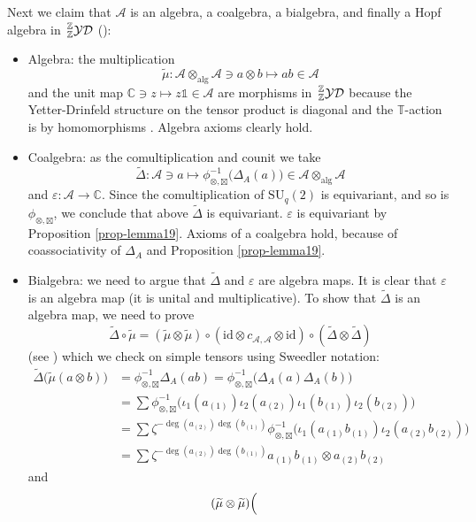 \documentclass[12pt,reqno,a4paper]{amsart}
\theoremstyle{definition}
\newcommand{\comp}{\circ}
\newcommand{\eps}{\varepsilon}
\newcommand{\I}{\mathds{1}}
\newcommand{\id}{\mathrm{id}}
\newcommand{\tens}{\otimes}
\newcommand{\algtens}{\otimes_{\textrm{alg}}}
\newcommand{\CC}{\mathbb{C}}
\newcommand{\TT}{\mathbb{T}}
\newcommand{\ZZ}{\mathbb{Z}}
\newcommand{\cA}{\mathscr{A}}
\newcommand{\SU}{\mathrm{SU}}
\numberwithin{equation}{section}
\begin{document}
Next we claim that $\cA$ is an algebra, a coalgebra, a bialgebra, and finally a Hopf algebra in $\sideset{_\ZZ^\ZZ}{}{\operatorname{\mathcal{YD}}}$ (\cite[Page 40]{HeckenbergerSchneider}):
\begin{itemize}
\item Algebra: the multiplication
\[
\widetilde{\mu}\colon\cA\algtens\cA\ni a\tens b\longmapsto ab\in\cA
\]
and the unit map $\CC\ni z\mapsto z\I \in\cA$ are morphisms in $\sideset{_\ZZ^\ZZ}{}{\operatorname{\mathcal{YD}}}$ because the Yetter-Drinfeld structure on the tensor product is diagonal and the $\TT$-action is by homomorphisms \cite[Page 29]{HeckenbergerSchneider}. Algebra axioms clearly hold.
\item Coalgebra: as the comultiplication and counit we take
\[
\widetilde{\Delta}\colon\cA\ni a\longmapsto\phi_{\tens,\boxtimes}^{-1}\bigl(\Delta_A(a)\bigr)\in\cA\algtens\cA
\]
and $\eps\colon\cA\to\CC$. Since the comultiplication of $\SU_q(2)$ is equivariant, and so is $\phi_{\tens,\boxtimes}$, we conclude that above $\widetilde{\Delta}$ is equivariant. $\eps$ is equivariant by Proposition \ref{prop-lemma19}. Axioms of a coalgebra hold, because of coassociativity of $\Delta_A$ and Proposition \ref{prop-lemma19}.
\item Bialgebra: we need to argue that $\widetilde{\Delta}$ and $\eps$ are algebra maps. It is clear that $\eps$ is an algebra map (it is unital and multiplicative). To show that $\widetilde{\Delta}$ is an algebra map, we need to prove
\[
\widetilde{\Delta}\comp\widetilde{\mu}
=(\widetilde{\mu}\tens\widetilde{\mu})\comp(\id\tens c_{\cA,\cA}\tens\id)\comp(\widetilde{\Delta}\tens\widetilde{\Delta})
\]
(see \cite[Definition 1.6.3]{HeckenbergerSchneider}) which we check on simple tensors using Sweedler notation:
\begin{align*}
\widetilde{\Delta}\bigl(\widetilde{\mu}(a\tens b)\bigr)
&=\phi_{\tens,\boxtimes}^{-1}\Delta_A(ab)
=\phi_{\tens,\boxtimes}^{-1}\bigl(\Delta_A(a)\Delta_A(b)\bigr)\\
&=\sum \phi_{\tens,\boxtimes}^{-1}\bigl(
\iota_1(a_{(1)})\iota_2(a_{(2)})\iota_1(b_{(1)})\iota_2(b_{(2)})
\bigr)\\
&=\sum \zeta^{-\deg(a_{(2)})\deg(b_{(1)})}
\phi_{\tens,\boxtimes}^{-1}\bigl(\iota_1(a_{(1)}b_{(1)})\iota_2(a_{(2)}b_{(2)})\bigr)\\
&=\sum \zeta^{-\deg(a_{(2)})\deg(b_{(1)})}a_{(1)}b_{(1)}\tens a_{(2)}b_{(2)}
\end{align*}
and
\begin{align*}
(\widetilde{\mu}\tens\widetilde{\mu})&\Bigl(

\end{align*}
\end{itemize}
\end{document}
